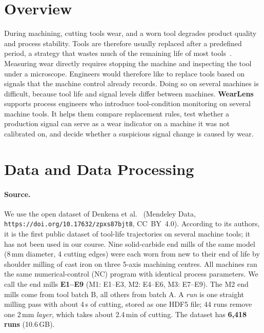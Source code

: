 \providecommand{\toprule}{\hline}
\providecommand{\midrule}{\hline}
\providecommand{\bottomrule}{\hline}
\providecommand{\url}[1]{\texttt{#1}}

\section{Overview}
During machining, cutting tools wear, and a worn tool degrades product quality and process stability.
Tools are therefore usually replaced after a predefined period, a strategy that wastes much of the
remaining life of most tools~\cite{denkena2023}. Measuring wear directly requires stopping the machine and
inspecting the tool under a microscope. Engineers would therefore like to replace tools based on signals
that the machine control already records. Doing so on several machines is difficult, because tool life and
signal levels differ between machines.
\textbf{WearLens} supports process engineers who introduce tool-condition monitoring on several machine
tools. It helps them compare replacement rules, test whether a production signal can serve as a wear
indicator on a machine it was not calibrated on, and decide whether a suspicious signal change is
caused by wear.

\section{Data and Data Processing}
\paragraph{Source.}
We use the open dataset of Denkena et al.~\cite{denkena2023}
(Mendeley Data, \url{https://doi.org/10.17632/zpxs87bjt8}, CC~BY~4.0). According to its authors, it is the
first public dataset of tool-life trajectories on several machine tools; it has not been used in our course.
Nine solid-carbide end mills of the same model (8\,mm diameter, 4 cutting edges) were each worn from new to
their end of life by shoulder milling of cast iron on three 5-axis machining centres. All machines ran the
same numerical-control (NC) program with identical process parameters. We call the end mills
\textbf{E1--E9} (M1: E1--E3, M2: E4--E6, M3: E7--E9). The M2 end mills come from tool batch B, all others
from batch A. A \emph{run} is one straight milling pass with about 4\,s of cutting, stored as one HDF5 file;
44 runs remove one 2\,mm \emph{layer}, which takes about 2.4\,min of cutting. The dataset has
\textbf{6,418 runs} (10.6\,GB).

